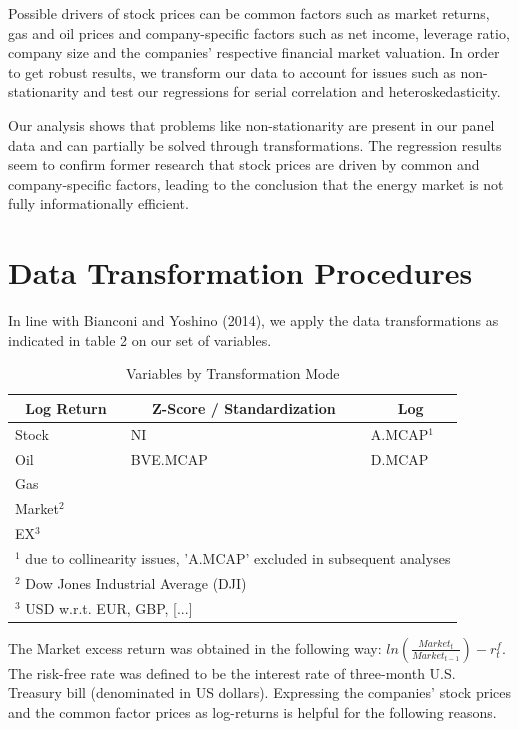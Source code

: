 \documentclass[a4paper]{article}
\begin{document}
Possible drivers of stock prices can be common factors such as market returns, gas and oil prices and company-specific factors such as net income, leverage ratio, company size and the companies' respective financial market valuation. In order to get robust results, we transform our data to account for issues such as non-stationarity and test our regressions for serial correlation and heteroskedasticity.

Our analysis shows that problems like non-stationarity are present in our panel data and can partially be solved through transformations. The regression results seem to confirm former research that stock prices are driven by common and company-specific factors, leading to the conclusion that the energy market is not fully informationally efficient.

\section{Data Transformation Procedures}

In line with Bianconi and Yoshino (2014), we apply the data transformations as indicated in table 2 on our set of variables.

\begin{table}[ht]
\centering
\begin{tabular}{l|l|l}
\hline
\hline
\multicolumn{1}{c|}{Log Return} & \multicolumn{1}{c|}{Z-Score / Standardization} & \multicolumn{1}{c}{Log} \\
\hline
Stock & NI & A.MCAP$^{1}$ \\ 
Oil &BVE.MCAP &  D.MCAP\\ 
Gas& & \\ 
Market$^{2}$& &\\ 
EX$^{3}$& & \\ 
\hline
\hline
\multicolumn{3}{l}{\footnotesize $^{1}$ due to collinearity issues, 'A.MCAP' excluded in subsequent analyses} \\
\multicolumn{3}{l}{\footnotesize $^{2}$ Dow Jones Industrial Average (DJI)} \\
\multicolumn{3}{l}{\footnotesize $^{3}$ USD w.r.t. EUR, GBP, [...]}
\end{tabular}
\label{}
\caption{Variables by Transformation Mode}
\end{table}

The Market excess return was obtained in the following way: $ln(\frac{Market_{t}}{Market_{t-1}})-r^{f}_{t}$. The risk-free rate was defined to be the interest rate of three-month U.S. Treasury bill (denominated in US dollars). Expressing the companies' stock prices and the common factor prices as log-returns is helpful for the following reasons.
\end{document}
